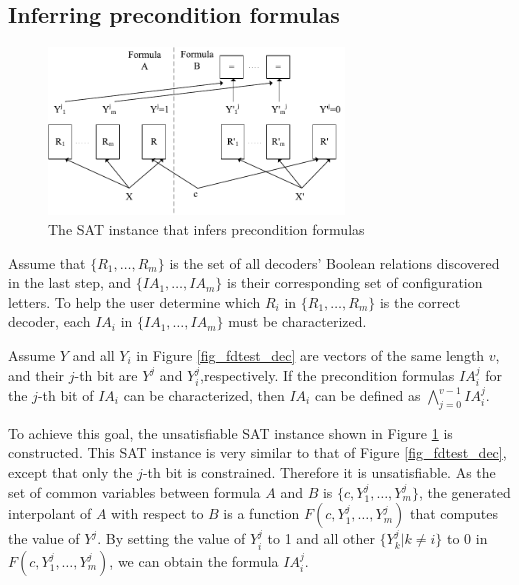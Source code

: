 \documentclass[runningheads,a4paper]{llncs}
\begin{document}
\subsection{Inferring precondition formulas}
\begin{figure}[b]
\centering
\includegraphics[width=0.7\textwidth]{fdtest_infer}
\caption{The SAT instance that infers precondition formulas}
\label{fig_fdtest_infer}
\end{figure}

Assume that $\{R_1,\dots,R_{m}\}$ is the set of all decoders' Boolean relations discovered in the last step,
and $\{IA_1,\dots,IA_{m}\}$ is their corresponding set of configuration letters.
To help the user determine which $R_i$ in $\{R_1,\dots,R_{m}\}$ is the correct decoder,
each $IA_i$ in $\{IA_1,\dots,IA_{m}\}$ must be characterized.

Assume $Y$ and all $Y_i$ in Figure \ref{fig_fdtest_dec} are vectors of the same length $v$,
and their $j$-th bit are $Y^{j}$ and $Y_i^{j}$,respectively.
If the precondition formulas $IA^j_i$ for the $j$-th bit of $IA_i$ can be characterized,
then $IA_i$ can be defined as $\bigwedge _{j=0}^{v-1} IA^j_i$.

To achieve this goal,
the unsatisfiable SAT instance shown in Figure \ref{fig_fdtest_infer} is constructed.
This SAT instance is very similar to that of Figure \ref{fig_fdtest_dec},
except that only the $j$-th bit is constrained.
Therefore it is unsatisfiable.
As the set of common variables between formula $A$ and $B$ is $\{c, Y_1^j, \dots, Y_m^j\}$,
the generated interpolant of $A$ with respect to $B$ is a function $F(c,Y_1^j, \dots, Y_m^j)$ that computes the value of $Y^j$.
By setting the value of $Y_i^j$ to 1 and all other $\{Y_k^j|k\ne i\}$ to 0 in $F(c,Y_1^j, \dots, Y_m^j)$,
we can obtain the formula $IA^j_i$.
\end{document}
